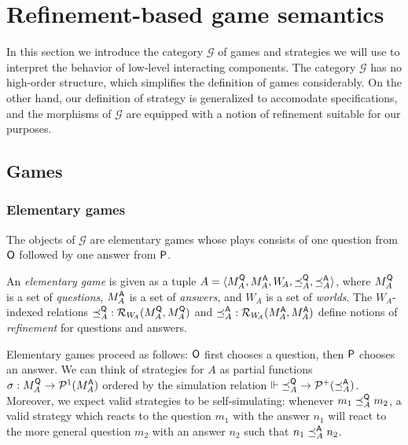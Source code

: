 \section{Refinement-based game semantics}

In this section we introduce the category $\mathcal{G}$ of games and strategies
we will use to interpret the behavior of low-level interacting components.
The category $\mathcal{G}$ has no high-order structure,
which simplifies the definition of games considerably.
On the other hand,
our definition of strategy is generalized to accomodate specifications,
and the morphisms of $\mathcal{G}$ are equipped with a notion of refinement
suitable for our purposes.

\subsection{Games}

\subsubsection{Elementary games}

The objects of $\mathcal{G}$ are elementary games whose plays consists of
one question from $ \mathsf{O} $ followed by one answer from $ \mathsf{P} $.

\begin{definition}
An \emph{elementary game} is given as a tuple
$A = \langle M_A^{ \mathsf{Q} }, M_A^{ \mathsf{A} }, W_{\!A},
       \preceq_A^{ \mathsf{Q} }, \preceq_A^{ \mathsf{A} } \rangle$, where
$M_A^{ \mathsf{Q} }$ is a set of \emph{questions},
$M_A^{ \mathsf{A} }$ is a set of \emph{answers}, and
$W_{\!A}$ is a set of \emph{worlds}.
The $W_{\!A}$-indexed relations
${\preceq}_A^{ \mathsf{Q} } : \mathcal{R}_{W_{\!A}}(M_A^{ \mathsf{Q} }, M_A^{ \mathsf{Q} })$ and
${\preceq}_A^{ \mathsf{A} } : \mathcal{R}_{W_{\!A}}(M_A^{ \mathsf{A} }, M_A^{ \mathsf{A} })$
define notions of \emph{refinement} for questions and answers.
\end{definition}

Elementary games proceed as follows:
$ \mathsf{O} $ first chooses a question, then
$ \mathsf{P} $ chooses an answer.
We can think of strategies for $A$ as partial functions
$\sigma : M_A^{ \mathsf{Q} } \rightarrow \mathcal{P}^1(M_A^{ \mathsf{A} })$
ordered by the simulation relation
$\Vdash {\preceq}_A^{ \mathsf{Q} } \rightarrow \mathcal{P}^+({\preceq}_A^{ \mathsf{A} })$.
Moreover,
we expect valid strategies to be self-simulating:
whenever $m_1 \preceq_A^{ \mathsf{Q} } m_2$,
a valid strategy which reacts to the question $m_1$
with the answer $n_1$
will react to the more general question $m_2$
with an answer $n_2$ such that $n_1 \preceq_A^{ \mathsf{A} } n_2$.

